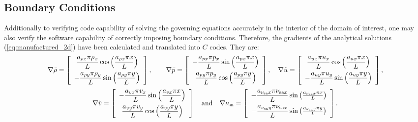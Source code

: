 \documentclass[10pt]{article}
\newcommand{\sa}{\nu_{\mathrm{sa}}}
\newcommand{\tsa}{\mathrm{sa}}
\newcommand{\brho}{\bar{\rho}}
\newcommand{\bp}{\bar{p}}
\newcommand{\tu}{\tilde{u}}
\newcommand{\tv}{\tilde{v}}
\begin{document}
\subsection{Boundary Conditions}
Additionally to verifying code capability of solving the governing equations accurately in the interior of the domain of interest, one may also verify the software capability of correctly imposing boundary conditions. Therefore, the gradients of the  analytical solutions (\ref{eq:manufactured_2d}) have been calculated and translated into $C$ codes. They are:
\begin{equation*}
\nabla  \brho= \left[ \begin{array}{c}
 \dfrac{  a_{\rho x}  \pi \rho_x}{L} \cos\left( \dfrac{ a_{\rho x}  \pi  x}{L}\right)\vspace{5pt} \\
-\dfrac{  a_{\rho y}  \pi \rho_y}{L} \sin\left( \dfrac{ a_{\rho y}  \pi  y}{L}\right)
\end{array} \right],
\qquad
\nabla \bp = \left[ \begin{array}{c}
- \dfrac{  a_{px}  \pi p_x}{L} \sin\left( \dfrac{ a_{px}  \pi  x}{L}\right)\vspace{5pt}\\
  \dfrac{  a_{py}  \pi p_y}{L} \cos\left( \dfrac{ a_{py}  \pi  y}{L}\right)
\end{array} \right],
\quad
\nabla \tu = \left[ \begin{array}{c}
  \dfrac{  a_{ux}  \pi u_x}{L} \cos\left( \dfrac{ a_{ux}  \pi  x}{L}\right)\vspace{5pt}\\
 -   \dfrac{  a_{uy}  \pi u_y}{L} \sin\left( \dfrac{ a_{uy}  \pi  y}{L}\right)
\end{array} \right],
\end{equation*}
\begin{equation*}
\nabla  \tv= \left[ \begin{array}{c}
-  \dfrac{  a_{vx}  \pi v_x}{L}  \sin\left( \dfrac{ a_{vx}  \pi  x}{L}\right)\vspace{5pt}\\
    \dfrac{  a_{vy}  \pi v_y}{L} \cos\left( \dfrac{ a_{vy}  \pi  y}{L}\right)
\end{array} \right]
\quad\mbox{and}\quad
\nabla \sa = \left[ \begin{array}{c}
-\dfrac{  a_{\sa x}  \pi  \nu_{\tsa x} }{L} \sin\left(\frac{a_{\sa x} \pi x}{L}\right)\vspace{5pt}\\
-  \dfrac{  a_{\sa y}  \pi  \nu_{\tsa x}}{L}  \sin\left(\frac{a_{\sa y} \pi y}{L}\right)
\end{array} \right].
\end{equation*}
\end{document}
